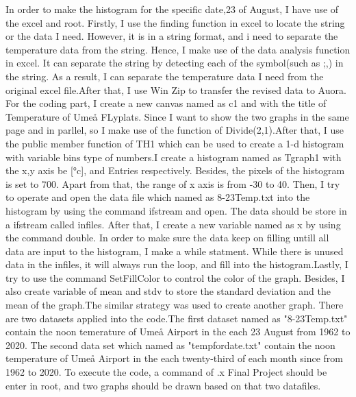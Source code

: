 \documentclass[a4, 12pt]{article}
\begin{document}
\newline \indent
In order to make the histogram for the specific date,23 of August, I have use of the excel and root. Firstly, I use the finding function in excel to locate the string or the data I need. However, it is in a string format, and i need to separate the temperature data from the string. Hence, I make use of the data analysis function in excel. It can separate the string by detecting each of the symbol(such as ;,) in the string. As a result, I can separate the temperature data I need from the original excel file.After that, I use Win Zip to transfer the revised data to Auora. For the coding part, I create a new canvas named as c1 and with the title of Temperature of Umeå FLyplats. Since I want to show the two graphs in the same page and in parllel, so I make use of the function of Divide(2,1).After that, I use the public member function of TH1 which can be used to create a 1-d histogram with variable bins type of numbers.I create a histogram named as Tgraph1 with the x,y axis be [°c], and Entries respectively. Besides, the pixels of the histogram is set to 700. Apart from that, the range of x axis is from -30 to 40. Then, I try to operate and open the data file which named as 8-23Temp.txt into the histogram by using the command ifstream and open. The data should be store in a ifstream called infiles. After that, I create a new variable named as x by using the command double. In order to make sure the data keep on filling untill all data are input to the histogram, I make a while statment. While there is unused data in the infiles, it will always run the loop, and fill into the histogram.Lastly, I try to use  the command SetFillColor to control the color of the graph. Besides, I also create variable of mean and stdv to store the standard deviation and the mean of the graph.The similar strategy was used to create another graph. There are two datasets applied into the code.The first dataset named as "8-23Temp.txt" contain the noon temerature of Umeå Airport in the each 23 August from 1962 to 2020. The second data set which named as "tempfordate.txt" contain the noon temperature of Umeå Airport in the each twenty-third of each month since from 1962 to 2020. To execute the code, a command of .x Final Project should be enter in root, and two graphs should be drawn based on that two datafiles.
\end{document}
